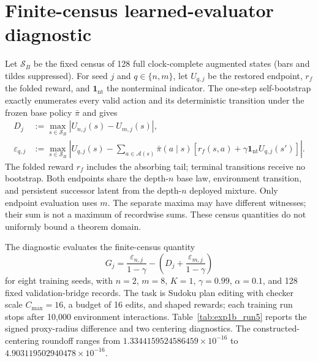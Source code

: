 \documentclass{article}
\theoremstyle{plain}
\theoremstyle{definition}
\theoremstyle{remark}
\begin{document}
\section{Finite-census learned-evaluator diagnostic}
\label{app:exp1b_diagnostic}

Let $\mathcal S_B$ be the fixed census of 128 full clock-complete
augmented states (bars and tildes suppressed). For seed $j$ and
$q\in\{n,m\}$, let $U_{q,j}$ be the restored endpoint, $r_f$ the folded reward, and
$\mathbf 1_{\mathrm{nt}}$ the nonterminal indicator. The one-step
self-bootstrap exactly enumerates every valid action and its deterministic
transition under the frozen base policy $\bar\pi$ and gives
\[
\begin{aligned}
D_j&:=\max_{s\in\mathcal S_B}|U_{n,j}(s)-U_{m,j}(s)|,\\
\varepsilon_{q,j}&:=\max_{s\in\mathcal S_B}
\left|U_{q,j}(s)-\sum_{a\in\mathcal A(s)}
\bar\pi(a\mid s)\left[r_f(s,a)
+\gamma\mathbf 1_{\mathrm{nt}}U_{q,j}(s')\right]\right|.
\end{aligned}
\]
The folded reward $r_f$ includes the absorbing tail; terminal transitions
receive no bootstrap. Both endpoints share the depth-$n$ base law,
environment transition, and persistent successor latent from the depth-$n$
deployed mixture. Only endpoint evaluation uses $m$. The separate maxima may
have different witnesses; their sum is not a maximum of recordwise sums.
These census quantities do not uniformly bound a theorem domain.

The diagnostic evaluates the finite-census quantity
\begin{equation}
G_j=
\frac{\varepsilon_{n,j}}{1-\gamma}
-\left(D_j+\frac{\varepsilon_{m,j}}{1-\gamma}\right)
\label{eq:exp1b_gap}
\end{equation}
for eight training seeds, with $n=2$, $m=8$, $K=1$,
$\gamma=0.99$, $\alpha=0.1$, and 128 fixed validation-bridge records. The
task is Sudoku plan editing with checker scale $C_{\max}=16$, a budget of 16
edits, and shaped rewards; each training run stops after 10,000 environment
interactions.
Table~\ref{tab:exp1b_run5} reports the signed proxy-radius difference and two
centering diagnostics. The constructed-centering roundoff ranges from
$1.3344159524586459\times10^{-16}$ to
$4.903119502940478\times10^{-16}$.
\end{document}
